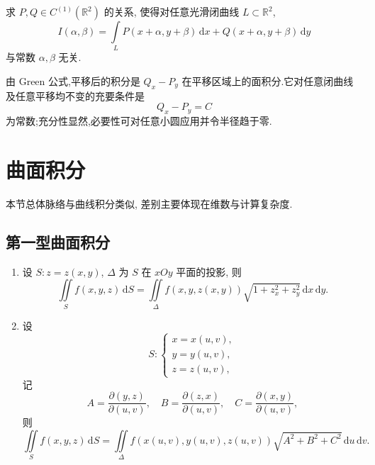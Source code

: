 \begin{example}
    求 $P,Q\in C^{(1)}(\mathbb{R}^2)$ 的关系, 使得对任意光滑闭曲线 $L\subset\mathbb{R}^2$,
    \[
        I(\alpha,\beta)=\int\limits_LP(x+\alpha,y+\beta)\,\mathrm{d}x+Q(x+\alpha,y+\beta)\,\mathrm{d}y
    \]
    与常数 $\alpha,\beta$ 无关.
\end{example}
\exampleblank

\begin{solution}
    由 Green 公式,平移后的积分是 $Q_x-P_y$ 在平移区域上的面积分.它对任意闭曲线及任意平移均不变的充要条件是
    \[
        Q_x-P_y=C
    \]
    为常数;充分性显然,必要性可对任意小圆应用并令半径趋于零.
\end{solution}


\newpage

\section{曲面积分}

本节总体脉络与曲线积分类似, 差别主要体现在维数与计算复杂度.



\subsection{第一型曲面积分}

\begin{theorem}[\markstar]
    \leavevmode
    \begin{enumerate}
        \item 设 $S:z=z(x,y)$, $\Delta$ 为 $S$ 在 $xOy$ 平面的投影, 则
              \[
                  \displaystyle\iint\limits_S f(x,y,z)\,\mathrm{d}S
                  =\iint\limits_\Delta f(x,y,z(x,y))\sqrt{1+z_x^2+z_y^2}\,\mathrm{d}x\,\mathrm{d}y.
              \]
        \item 设
              \[
                  S:\begin{cases}
                      x=x(u,v), \\
                      y=y(u,v), \\
                      z=z(u,v),
                  \end{cases}
              \]
              记
              \[
                  A=\dfrac{\partial(y,z)}{\partial(u,v)},\quad
                  B=\dfrac{\partial(z,x)}{\partial(u,v)},\quad
                  C=\dfrac{\partial(x,y)}{\partial(u,v)},
              \]
              则
              \[
                  \displaystyle\iint\limits_Sf(x,y,z)\,\mathrm{d}S
                  =\iint\limits_\Delta f(x(u,v),y(u,v),z(u,v))\sqrt{A^2+B^2+C^2}\,\mathrm{d}u\,\mathrm{d}v.
              \]
    \end{enumerate}
\end{theorem}

